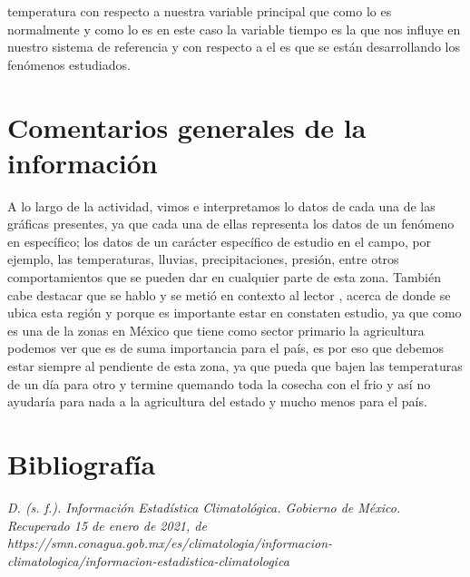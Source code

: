 \documentclass[12pt]{article}
\begin{document}
		temperatura con respecto a nuestra variable principal que como lo es normalmente y como lo es en este caso la variable tiempo es la que nos influye en nuestro sistema de referencia y con respecto a el es que se están desarrollando los fenómenos estudiados. 
		


\section{Comentarios generales de la información}

A lo largo de la actividad, vimos e interpretamos lo datos de cada una de las gráficas presentes, ya que cada una de ellas representa los datos de un fenómeno en específico; los datos de un carácter específico de estudio en el campo, por ejemplo, las temperaturas, lluvias, precipitaciones, presión, entre otros comportamientos que se pueden dar en cualquier parte de esta zona. También cabe destacar que se hablo y se metió en contexto al lector , acerca de donde se ubica esta región y porque es importante estar en constaten estudio, ya que como es una de la zonas en México que tiene como sector primario la agricultura podemos ver que es de suma importancia para el país, es por eso que debemos estar siempre al pendiente de esta zona, ya que pueda que bajen las temperaturas de un día para otro y termine quemando toda la cosecha con el frio y así no ayudaría para nada a la agricultura del estado y mucho menos para el país.

\section{Bibliografía}

\textit{D. (s. f.). Información Estadística Climatológica. Gobierno de México. Recuperado 15 de enero de 2021, de https://smn.conagua.gob.mx/es/climatologia/informacion-climatologica/informacion-estadistica-climatologica}
\end{document}
